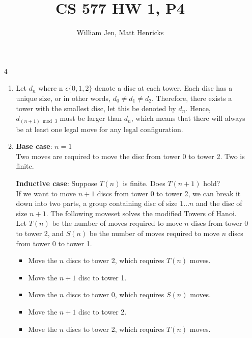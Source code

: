 \documentclass{article}
\title{CS 577 HW 1, P4}
\author{William Jen, Matt Henricks}
\date{}
\begin{document}
\maketitle

\begin{enumerate}
    \item[4]
        \begin{enumerate}
            \item Let $d_n$ where n $\epsilon \{ 0, 1, 2 \}$ denote a disc at each tower.
            Each disc has a unique size, or in other words, $d_0 \neq d_1 \neq d_2$. Therefore, there
            exists a tower with the smallest disc, let this be denoted by $d_n$. Hence, 
            $d_{\left(n + 1\right) \bmod 3}$ must be larger than $d_n$, which means
            that there will always be at least one legal move for any legal configuration.
            
            \item 
                \textbf{Base case}: $n = 1$ \\
                    Two moves are required to move the disc from tower 0 to tower 2. Two is finite.
                    
                \textbf{Inductive case}: Suppose $T(n)$ is finite. Does $T(n+1)$ hold?\\
                If we want to move $n + 1$ discs from tower 0 to tower 2, we can break it down into two parts,
                a group containing disc of size $1 \ldots n$ and the disc of size $n + 1$. 
                The following moveset solves the modified Towers of Hanoi. Let $T(n)$ be the number of moves 
                required to move $n$ discs from tower 0 to tower 2, and $S(n)$ be the number of moves required
                to move $n$ discs from tower 0 to tower 1. 
                \begin{itemize}
                    \item Move the $n$ discs to tower 2, which requires $T(n)$ moves.
                    \item Move the $n+1$ disc to tower 1.
                    \item Move the $n$ discs to tower 0, which requires $S(n)$ moves.
                    \item Move the $n+1$ disc to tower 2.
                    \item Move the $n$ discs to tower 2, which requires $T(n)$ moves.
                \end{itemize}
                

\end{enumerate}
\end{enumerate}
\end{document}
